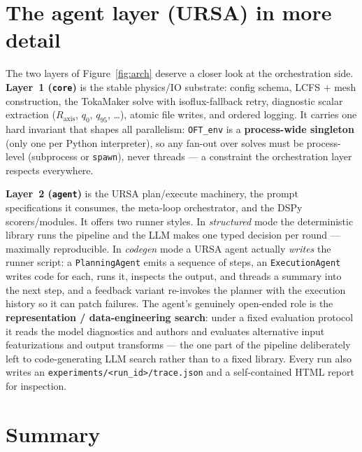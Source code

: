 \documentclass[11pt]{article}
\begin{document}
\section{The agent layer (URSA) in more detail}

The two layers of Figure~\ref{fig:arch} deserve a closer look at the orchestration side.
\textbf{Layer~1 (\texttt{core})} is the stable physics/IO substrate: config schema, LCFS + mesh
construction, the TokaMaker solve with isoflux-fallback retry, diagnostic scalar extraction
($R_{\text{axis}}$, $q_0$, $q_{95}$, \dots), atomic file writes, and ordered logging. It carries one
hard invariant that shapes all parallelism: \texttt{OFT\_env} is a \textbf{process-wide singleton}
(only one per Python interpreter), so any fan-out over solves must be process-level (subprocess or
\texttt{spawn}), never threads --- a constraint the orchestration layer respects everywhere.

\textbf{Layer~2 (\texttt{agent})} is the URSA plan/execute machinery, the prompt specifications it
consumes, the meta-loop orchestrator, and the DSPy scorers/modules. It offers two runner styles.
In \emph{structured} mode the deterministic library runs the pipeline and the LLM makes one typed
decision per round --- maximally reproducible. In \emph{codegen} mode a URSA agent actually
\emph{writes} the runner script: a \texttt{PlanningAgent} emits a sequence of steps, an
\texttt{ExecutionAgent} writes code for each, runs it, inspects the output, and threads a summary
into the next step, and a feedback variant re-invokes the planner with the execution history so it
can patch failures. The agent's genuinely open-ended role is the \textbf{representation /
data-engineering search}: under a fixed evaluation protocol it reads the model diagnostics and
authors and evaluates alternative input featurizations and output transforms --- the one part of
the pipeline deliberately left to code-generating LLM search rather than to a fixed library. Every
run also writes an \texttt{experiments/<run\_id>/trace.json} and a self-contained HTML report for
inspection.

\section{Summary}
\end{document}
